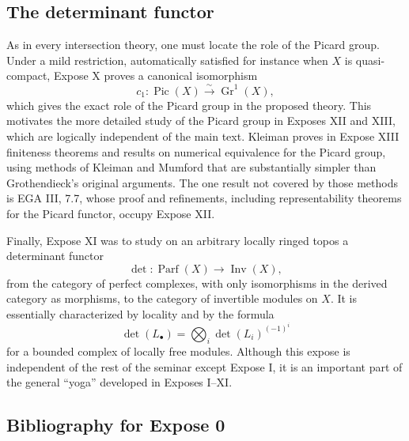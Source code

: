 \documentclass[11pt]{article}
\theoremstyle{plain}
\theoremstyle{definition}
\theoremstyle{remark}
\DeclareMathOperator{\Pic}{Pic}
\DeclareMathOperator{\Gr}{Gr}
\providecommand{\Parf}{\operatorname{Parf}}
\providecommand{\detn}{\operatorname{det}}
\providecommand{\Inv}{\operatorname{Inv}}
\begin{document}
\subsection{The determinant functor}

As in every intersection theory, one must locate the role of the Picard group. Under a mild restriction, automatically satisfied for instance when $X$ is quasi-compact, Expose X proves a canonical isomorphism
\[
   c_1:\Pic(X)\xrightarrow{\sim}\Gr^1(X),
\]
which gives the exact role of the Picard group in the proposed theory. This motivates the more detailed study of the Picard group in Exposes XII and XIII, which are logically independent of the main text. Kleiman proves in Expose XIII finiteness theorems and results on numerical equivalence for the Picard group, using methods of Kleiman and Mumford that are substantially simpler than Grothendieck's original arguments. The one result not covered by those methods is EGA III, 7.7, whose proof and refinements, including representability theorems for the Picard functor, occupy Expose XII.

Finally, Expose XI was to study on an arbitrary locally ringed topos a determinant functor
\[
   \detn:\Parf(X)\to\Inv(X),
\]
from the category of perfect complexes, with only isomorphisms in the derived category as morphisms, to the category of invertible modules on $X$. It is essentially characterized by locality and by the formula
\[
   \detn(L_{\bullet})=\bigotimes_i \det(L_i)^{(-1)^i}
\]
for a bounded complex of locally free modules. Although this expose is independent of the rest of the seminar except Expose I, it is an important part of the general ``yoga'' developed in Exposes I--XI.

\subsection*{Bibliography for Expose 0}
\end{document}
